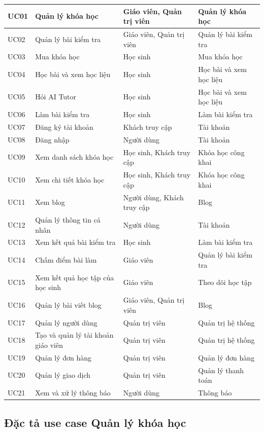 ﻿\documentclass[../DoAn.tex]{subfiles}
\begin{document}
\begin{longtable}{|p{1.7cm}|p{4.4cm}|p{2.7cm}|p{4.1cm}|}
UC01 & Quản lý khóa học & Giáo viên, Quản trị viên & Quản lý khóa học \\ \hline
UC02 & Quản lý bài kiểm tra & Giáo viên, Quản trị viên & Quản lý bài kiểm tra \\ \hline
UC03 & Mua khóa học & Học sinh & Mua khóa học \\ \hline
UC04 & Học bài và xem học liệu & Học sinh & Học bài và xem học liệu \\ \hline
UC05 & Hỏi AI Tutor & Học sinh & Học bài và xem học liệu \\ \hline
UC06 & Làm bài kiểm tra & Học sinh & Làm bài kiểm tra \\ \hline
UC07 & Đăng ký tài khoản & Khách truy cập & Tài khoản \\ \hline
UC08 & Đăng nhập & Người dùng & Tài khoản \\ \hline
UC09 & Xem danh sách khóa học & Học sinh, Khách truy cập & Khóa học công khai \\ \hline
UC10 & Xem chi tiết khóa học & Học sinh, Khách truy cập & Khóa học công khai \\ \hline
UC11 & Xem blog & Người dùng, Khách truy cập & Blog \\ \hline
UC12 & Quản lý thông tin cá nhân & Người dùng & Tài khoản \\ \hline
UC13 & Xem kết quả bài kiểm tra & Học sinh & Làm bài kiểm tra \\ \hline
UC14 & Chấm điểm bài làm & Giáo viên & Quản lý bài kiểm tra \\ \hline
UC15 & Xem kết quả học tập của học sinh & Giáo viên & Theo dõi học tập \\ \hline
UC16 & Quản lý bài viết blog & Giáo viên, Quản trị viên & Blog \\ \hline
UC17 & Quản lý người dùng & Quản trị viên & Quản trị hệ thống \\ \hline
UC18 & Tạo và quản lý tài khoản giáo viên & Quản trị viên & Quản trị hệ thống \\ \hline
UC19 & Quản lý đơn hàng & Quản trị viên & Quản lý đơn hàng \\ \hline
UC20 & Quản lý giao dịch & Quản trị viên & Quản lý thanh toán \\ \hline
UC21 & Xem và xử lý thông báo & Người dùng & Thông báo \\ \hline
\end{longtable}
\endgroup

\subsection{Đặc tả use case Quản lý khóa học}
\label{subsection:2.3.1}
\end{document}
